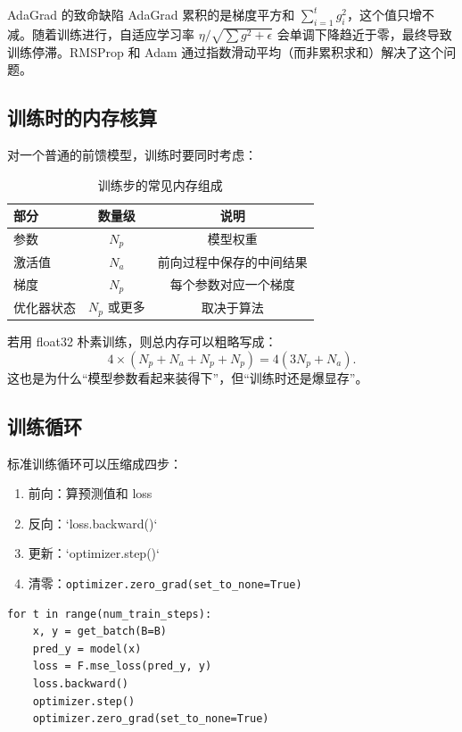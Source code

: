 \documentclass[a4paper]{article}
\begin{document}
\begin{warningbox}{AdaGrad 的致命缺陷}
AdaGrad 累积的是梯度平方和 $\sum_{i=1}^{t} g_i^2$，这个值只增不减。随着训练进行，自适应学习率 $\eta / \sqrt{\sum g^2 + \epsilon}$ 会单调下降趋近于零，最终导致训练停滞。RMSProp 和 Adam 通过指数滑动平均（而非累积求和）解决了这个问题。
\end{warningbox}

\subsection{训练时的内存核算}

对一个普通的前馈模型，训练时要同时考虑：

\begin{table}[H]
\centering
\begin{tabular}{lcc}
\toprule
\textbf{部分} & \textbf{数量级} & \textbf{说明} \\
\midrule
参数 & \(N_p\) & 模型权重 \\
激活值 & \(N_a\) & 前向过程中保存的中间结果 \\
梯度 & \(N_p\) & 每个参数对应一个梯度 \\
优化器状态 & \(N_p\) 或更多 & 取决于算法 \\
\bottomrule
\end{tabular}
\caption{训练步的常见内存组成}
\end{table}

若用 float32 朴素训练，则总内存可以粗略写成：
\[
4 \times (N_p + N_a + N_p + N_p) = 4(3N_p + N_a).
\]
这也是为什么“模型参数看起来装得下”，但“训练时还是爆显存”。

\subsection{训练循环}

标准训练循环可以压缩成四步：

\begin{enumerate}
    \item 前向：算预测值和 loss
    \item 反向：`loss.backward()`
    \item 更新：`optimizer.step()`
    \item 清零：\texttt{optimizer.zero\_grad(set\_to\_none=True)}
\end{enumerate}

\begin{lstlisting}
for t in range(num_train_steps):
    x, y = get_batch(B=B)
    pred_y = model(x)
    loss = F.mse_loss(pred_y, y)
    loss.backward()
    optimizer.step()
    optimizer.zero_grad(set_to_none=True)
\end{lstlisting}
\end{document}
